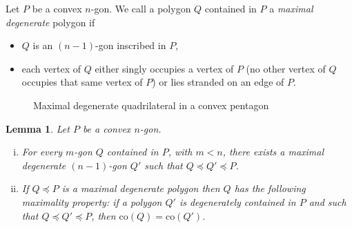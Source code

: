 \documentclass[11pt]{amsart}
\newtheorem{lemma}[theorem]{Lemma}
\theoremstyle{remark}
\numberwithin{equation}{section}
\newcommand{\co}{\mathrm{co}}
\renewcommand{\precsim}{\preccurlyeq}
\begin{document}
Let $P$ be a convex $n$-gon. 
We call a polygon $Q$ contained in  $P$ a \emph{maximal degenerate} polygon if 
\begin{itemize}
\item
$Q$ is an $(n-1)$-gon inscribed in $P$,
\item
each vertex of $Q$ either singly occupies a vertex of $P$ (no other vertex of $Q$ occupies that same vertex of $P$) or lies stranded on an edge of $P$.
\end{itemize}


\begin{figure}[h]
\centering


\caption{Maximal degenerate quadrilateral in a convex pentagon}
\label{fig_maxdeg}
\end{figure}

\begin{lemma}\label{maxdeg}  
Let $P$ be a convex $n$-gon.
\begin{enumerate}[(i)]
\item
For every $m$-gon $Q$ contained in $P$, with $m<n$, there exists a maximal degenerate  $(n-1)$-gon $Q'$ such that $Q\precsim Q'\precsim P$. 
\item
If $Q\precsim P$ is a maximal degenerate polygon then $Q$ has the following maximality property: if  a polygon $Q'$ is degenerately contained in $P$ and such that $Q\precsim Q'\precsim P$, then $\co(Q)=\co(Q')$.
\end{enumerate} 
\end{lemma}
\end{document}
